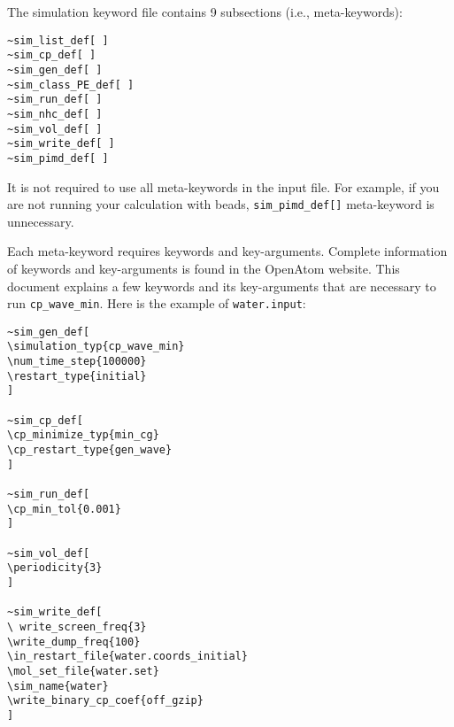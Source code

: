 The simulation keyword file contains 9 subsections (i.e., meta-keywords):
\begin{verbatim}
~sim_list_def[ ]
~sim_cp_def[ ]
~sim_gen_def[ ]
~sim_class_PE_def[ ]
~sim_run_def[ ]
~sim_nhc_def[ ]
~sim_vol_def[ ]
~sim_write_def[ ]
~sim_pimd_def[ ]
\end{verbatim}

It is not required to use all meta-keywords in the input file. For example, if you are not running your calculation with beads, \verb+sim_pimd_def[]+ meta-keyword is unnecessary. 

Each meta-keyword requires keywords and key-arguments. Complete information of keywords and key-arguments is found in the OpenAtom website. This document explains a few keywords and its key-arguments that are necessary to run \verb+cp_wave_min+.
Here is the example of \verb+water.input+:

\begin{verbatim}
~sim_gen_def[
\simulation_typ{cp_wave_min}
\num_time_step{100000}
\restart_type{initial}
]
 
~sim_cp_def[
\cp_minimize_typ{min_cg}
\cp_restart_type{gen_wave}
]

~sim_run_def[
\cp_min_tol{0.001}
]

~sim_vol_def[
\periodicity{3}
]

~sim_write_def[
\ write_screen_freq{3}
\write_dump_freq{100}
\in_restart_file{water.coords_initial}
\mol_set_file{water.set}
\sim_name{water}
\write_binary_cp_coef{off_gzip}
]
\end{verbatim}

